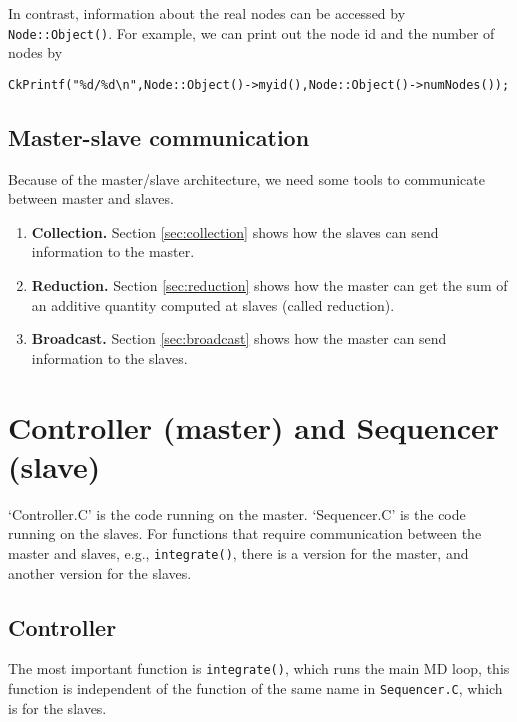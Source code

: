 \documentclass{article}
\begin{document}
In contrast, information about the real nodes
can be accessed by \texttt{Node::Object()}.
%
For example, we can print out the node id and the number of nodes by
\begin{lstlisting}
CkPrintf("%d/%d\n",Node::Object()->myid(),Node::Object()->numNodes());
\end{lstlisting}


\subsection{Master-slave communication}

Because of the master/slave architecture,
we need some tools to communicate between master and slaves.
%
\begin{enumerate}
  \item \textbf{Collection.}
    Section \ref{sec:collection} shows how the slaves
    can send information to the master.

  \item \textbf{Reduction.}
    Section \ref{sec:reduction} shows how the master
    can get the sum of an additive quantity
    computed at slaves (called reduction).

  \item \textbf{Broadcast.}
    Section \ref{sec:broadcast} shows how the master
    can send information to the slaves.
\end{enumerate}
%


\section{Controller (master) and Sequencer (slave)}

`Controller.C' is the code running on the master.
`Sequencer.C' is the code running on the slaves.
For functions that require communication between
the master and slaves, e.g., \texttt{integrate()},
there is a version for the master,
and another version for the slaves.

\subsection{Controller}

The most important function is \texttt{integrate()},
which runs the main MD loop,
this function is independent of the function of the same name
in \texttt{Sequencer.C},
which is for the slaves.
\end{document}
